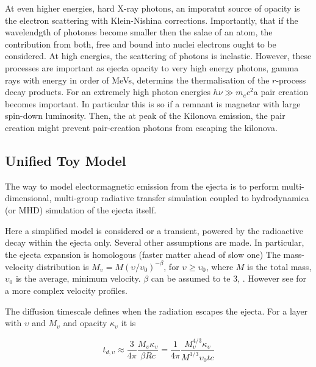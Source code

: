 \documentclass[11pt,a4paper,headinclude=true,DIV=14,BCOR=8mm,chapterprefix,listof=totoc,twoside,openright,abstracton]{scrbook}
\begin{document}
At even higher energies, hard X-ray photons, an imporatnt source of opacity is the electron scattering with Klein-Nishina corrections. Importantly, that if the wavelendgth of photones become smaller then the salae of an atom, the contribution from both, free and bound into nuclei electrons ought to be considered. At high energies, the scattering of photons is inelastic. However, these processes are important as ejecta opacity to very high energy photons, gamma rays with energy in order of MeVs, determins the thermalisation of the $r$-process decay products.
For an extremely high photon energies $h\nu \gg m_e c^2$a pair creation becomes important. In particular this is so if a remnant is magnetar with large spin-down luminosity. Then, the at peak of the Kilonova emission, the pair creation might prevent pair-creation photons from escaping the kilonova. 


\subsection{Unified Toy Model}

The way to model electormagnetic emission from the ejecta is to perform multi-dimensional, multi-group radiative transfer simulation coupled to hydrodynamica (or MHD) simulation of the ejecta itself.

Here a simplified model is considered or a transient, powered by the radioactive decay within the ejecta only. Several other assumptions are made.
In particular, the ejecta expansion is homologous (faster matter ahead of slow one) \cite{(Rosswog et al 2014)}
The mass-velocity distribution is $M_{\upsilon} = M(\upsilon / \upsilon_0)^{-\beta}$, for $\upsilon \geq \upsilon_0$,
where $M$ is the total mass, $\upsilon_0$ is the average, minimum velocity. $\beta$ can be assumed to te $3$, \cite{(Bauswein et al 2013a)}. However see \cite{Piran et al 2013} for a more complex velocity profiles.

The diffusion timescale defines when the radiation escapes the ejecta. For a layer with $\upsilon$ and $M_{\upsilon}$ and opacity $\kappa_{\upsilon}$ it is 

\begin{equation}
    t_{d,\upsilon} \approx \frac{3}{4\pi}\frac{M_{\upsilon}\kappa_{\upsilon}}{\beta Rc} = \frac{1}{4\pi}\frac{M_{\upsilon}^{4/3}\kappa_{\upsilon}}{M^{1/3}\upsilon_0 t c}
\end{equation}
\end{document}
